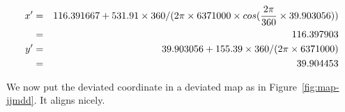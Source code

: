 \documentclass[a4paper]{article}
\begin{document}
\begin{eqnarray}
x' &=& 116.391667+531.91\times 360/(2\pi\times 6371000\times cos({2\pi \over 360}\times 39.903056)) \nonumber \\
   &=& 116.397903 \nonumber \\
y' &=& 39.903056+155.39\times 360/(2\pi\times 6371000) \nonumber \\
   &=& 39.904453 \nonumber
\end{eqnarray}

We now put the deviated coordinate in a deviated map as in
Figure~\ref{fig:map-jjmdd}.  It aligns nicely.
\end{document}
